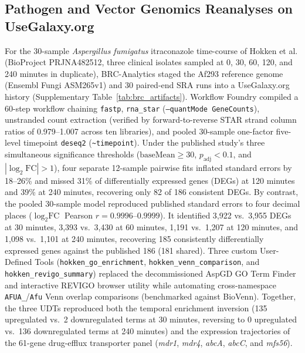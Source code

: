 \documentclass[11pt,letterpaper]{article}
\begin{document}
\subsection*{Pathogen and Vector Genomics Reanalyses on UseGalaxy.org}
For the 30-sample \textit{Aspergillus fumigatus} itraconazole time-course of Hokken et al. \cite{hokken2018} (BioProject PRJNA482512, three clinical isolates sampled at 0, 30, 60, 120, and 240 minutes in duplicate), BRC-Analytics staged the Af293 reference genome (Ensembl Fungi ASM265v1) and 30 paired-end SRA runs into a UseGalaxy.org history (Supplementary Table~\ref{tab:brc_artifacts}). Workflow Foundry compiled a 60-step workflow chaining \texttt{fastp}, \texttt{rna\_star} (\texttt{--quantMode GeneCounts}), unstranded count extraction (verified by forward-to-reverse STAR strand column ratios of 0.979--1.007 across ten libraries), and pooled 30-sample one-factor five-level timepoint \texttt{deseq2} (\texttt{\textasciitilde timepoint}). Under the published study's three simultaneous significance thresholds ($\text{baseMean} \ge 30$, $p_{\text{adj}} < 0.1$, and $|\log_2\text{FC}| > 1$), four separate 12-sample pairwise fits inflated standard errors by 18--26\% and missed 31\% of differentially expressed genes (DEGs) at 120 minutes and 39\% at 240 minutes, recovering only 82 of 186 consistent DEGs. By contrast, the pooled 30-sample model reproduced published standard errors to four decimal places ($\log_2\text{FC}$ Pearson $r = 0.9996\text{--}0.9999$). It identified 3,922 vs.\ 3,955 DEGs at 30 minutes, 3,393 vs.\ 3,430 at 60 minutes, 1,191 vs.\ 1,207 at 120 minutes, and 1,098 vs.\ 1,101 at 240 minutes, recovering 185 consistently differentially expressed genes against the published 186 (181 shared). Three custom User-Defined Tools (\texttt{hokken\_go\_enrichment}, \texttt{hokken\_venn\_comparison}, and \texttt{hokken\_revigo\_summary}) replaced the decommissioned AspGD GO Term Finder and interactive REVIGO browser utility while automating cross-namespace \texttt{AFUA\_}/\texttt{Afu} Venn overlap comparisons (benchmarked against BioVenn). Together, the three UDTs reproduced both the temporal enrichment inversion (135 upregulated vs.\ 2 downregulated terms at 30 minutes, reversing to 0 upregulated vs.\ 136 downregulated terms at 240 minutes) and the expression trajectories of the 61-gene drug-efflux transporter panel (\textit{mdr1}, \textit{mdr4}, \textit{abcA}, \textit{abcC}, and \textit{mfs56}).
\end{document}

